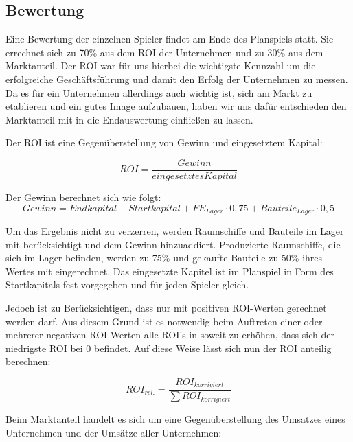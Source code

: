 \subsection{Bewertung}
\label{sub:spielwelt-logik-bewertung}

Eine Bewertung der einzelnen Spieler findet am Ende des Planspiels statt. Sie errechnet sich zu 70\% aus dem
ROI der Unternehmen und zu 30\% aus dem Marktanteil. Der ROI war für uns hierbei die wichtigste Kennzahl um die
erfolgreiche Geschäftsführung und damit den Erfolg der Unternehmen zu messen. Da es für ein Unternehmen allerdings
auch wichtig ist, sich am Markt zu etablieren und ein gutes Image aufzubauen, haben wir uns dafür entschieden den
Marktanteil mit in die Endauswertung einfließen zu lassen.

Der ROI ist eine Gegenüberstellung von Gewinn und eingesetztem Kapital:

\begin{equation}
     ROI = \frac{Gewinn}{eingesetztes Kapital}
     \label{alg:spielwelt-logik-bewertung-ROI}
\end{equation}

Der Gewinn berechnet sich wie folgt:
\begin{equation}
     Gewinn = Endkapital - Startkapital + FE_{Lager} \cdot 0,75 + Bauteile_{Lager} \cdot 0,5
     \label{alg:spielwelt-logik-bewertung-Gewinn}
\end{equation}

Um das Ergebnis nicht zu verzerren, werden Raumschiffe und Bauteile im Lager mit berücksichtigt und dem Gewinn hinzuaddiert.
Produzierte Raumschiffe, die sich im Lager befinden, werden zu 75\% und gekaufte Bauteile zu 50\% ihres Wertes mit eingerechnet.
Das eingesetzte Kapitel ist im Planspiel in Form des Startkapitals fest vorgegeben und für jeden Spieler gleich.

Jedoch ist zu Berücksichtigen, dass nur mit positiven ROI-Werten gerechnet werden darf. Aus diesem Grund ist es notwendig
beim Auftreten einer oder mehrerer negativen ROI-Werten alle ROI's in soweit zu erhöhen, dass sich der niedrigste ROI bei
0 befindet. Auf diese Weise lässt sich nun der ROI anteilig berechnen:

\begin{equation}
     ROI_{rel.} = \frac{ROI_{korrigiert}}{\sum ROI_{korrigiert}}
     \label{alg:spielwelt-logik-bewertung-rel. ROI}
\end{equation}

Beim Marktanteil handelt es sich um eine Gegenüberstellung des Umsatzes eines Unternehmen und der Umsätze aller Unternehmen:

